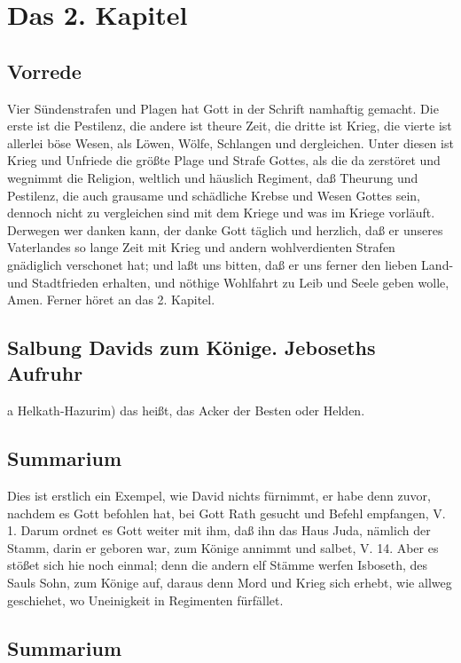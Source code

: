 \chapter{Das 2. Kapitel}

\section{Vorrede}

Vier Sündenstrafen und Plagen hat Gott in der Schrift namhaftig gemacht. Die erste ist die Pestilenz, die andere ist theure Zeit, die dritte ist Krieg, die vierte ist allerlei böse Wesen, als Löwen, Wölfe, Schlangen und dergleichen. Unter diesen ist Krieg und Unfriede die größte Plage und Strafe Gottes, als die da zerstöret und wegnimmt die Religion, weltlich und häuslich Regiment, daß Theurung und Pestilenz, die auch grausame und schädliche Krebse und Wesen Gottes sein, dennoch nicht zu vergleichen sind mit dem Kriege und was im Kriege vorläuft. Derwegen wer danken kann, der danke Gott täglich und herzlich, daß er unseres Vaterlandes so lange Zeit mit Krieg und andern wohlverdienten Strafen gnädiglich verschonet hat; und laßt uns bitten, daß er uns ferner den lieben Land- und Stadtfrieden erhalten, und nöthige Wohlfahrt zu Leib und Seele geben wolle, Amen. Ferner höret an das 2. Kapitel.

\section{Salbung Davids zum Könige. Jeboseths Aufruhr}

a Helkath-Hazurim) das heißt, das Acker der Besten oder Helden.

\section{Summarium}

Dies ist erstlich ein Exempel, wie David nichts fürnimmt, er habe denn zuvor, nachdem es Gott befohlen hat, bei Gott Rath gesucht und Befehl empfangen, V. 1. Darum ordnet es Gott weiter mit ihm, daß ihn das Haus Juda, nämlich der Stamm, darin er geboren war, zum Könige annimmt und salbet, V. 14. Aber es stößet sich hie noch einmal; denn die andern elf Stämme werfen Isboseth, des Sauls Sohn, zum Könige auf, daraus denn Mord und Krieg sich erhebt, wie allweg geschiehet, wo Uneinigkeit in Regimenten fürfället.

\section{Summarium}

